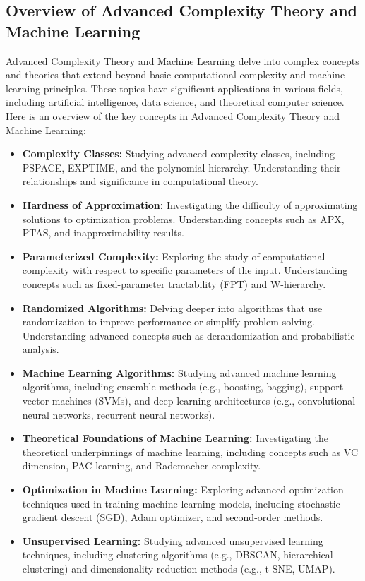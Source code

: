 \documentclass[openany]{book}
\begin{document}
\subsection{Overview of Advanced Complexity Theory and Machine Learning}
Advanced Complexity Theory and Machine Learning delve into complex concepts and theories that extend beyond basic computational complexity and machine learning principles. These topics have significant applications in various fields, including artificial intelligence, data science, and theoretical computer science. Here is an overview of the key concepts in Advanced Complexity Theory and Machine Learning:
\begin{itemize}
    \item \textbf{Complexity Classes:} Studying advanced complexity classes, including PSPACE, EXPTIME, and the polynomial hierarchy. Understanding their relationships and significance in computational theory.
    \item \textbf{Hardness of Approximation:} Investigating the difficulty of approximating solutions to optimization problems. Understanding concepts such as APX, PTAS, and inapproximability results.
    \item \textbf{Parameterized Complexity:} Exploring the study of computational complexity with respect to specific parameters of the input. Understanding concepts such as fixed-parameter tractability (FPT) and W-hierarchy.
    \item \textbf{Randomized Algorithms:} Delving deeper into algorithms that use randomization to improve performance or simplify problem-solving. Understanding advanced concepts such as derandomization and probabilistic analysis.
    \item \textbf{Machine Learning Algorithms:} Studying advanced machine learning algorithms, including ensemble methods (e.g., boosting, bagging), support vector machines (SVMs), and deep learning architectures (e.g., convolutional neural networks, recurrent neural networks).
    \item \textbf{Theoretical Foundations of Machine Learning:} Investigating the theoretical underpinnings of machine learning, including concepts such as VC dimension, PAC learning, and Rademacher complexity.
    \item \textbf{Optimization in Machine Learning:} Exploring advanced optimization techniques used in training machine learning models, including stochastic gradient descent (SGD), Adam optimizer, and second-order methods.
    \item \textbf{Unsupervised Learning:} Studying advanced unsupervised learning techniques, including clustering algorithms (e.g., DBSCAN, hierarchical clustering) and dimensionality reduction methods (e.g., t-SNE, UMAP).

\end{itemize}
\end{document}
